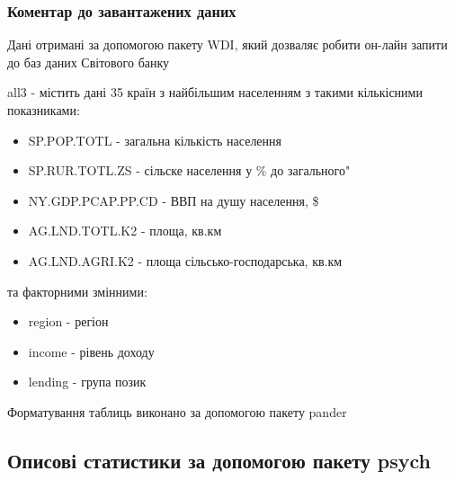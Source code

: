 \documentclass[
]{article}
\providecommand{\tightlist}{%
  \setlength{\itemsep}{0pt}\setlength{\parskip}{0pt}}
\begin{document}
\hypertarget{ux43aux43eux43cux435ux43dux442ux430ux440-ux434ux43e-ux437ux430ux432ux430ux43dux442ux430ux436ux435ux43dux438ux445-ux434ux430ux43dux438ux445}{%
\subsubsection{Коментар до завантажених
даних}\label{ux43aux43eux43cux435ux43dux442ux430ux440-ux434ux43e-ux437ux430ux432ux430ux43dux442ux430ux436ux435ux43dux438ux445-ux434ux430ux43dux438ux445}}

Дані отримані за допомогою пакету WDI, який дозваляє робити он-лайн
запити до баз даних Світового банку

all3 - містить дані 35 країн з найбільшим населенням з такими
кількісними показниками:

\begin{itemize}
\tightlist
\item
  SP.POP.TOTL - загальна кількість населення
\item
  SP.RUR.TOTL.ZS - сільске населення у \% до загального"
\item
  NY.GDP.PCAP.PP.CD - ВВП на душу населення, \$
\item
  AG.LND.TOTL.K2 - площа, кв.км
\item
  AG.LND.AGRI.K2 - площа сільсько-господарська, кв.км
\end{itemize}

та факторними змінними:

\begin{itemize}
\tightlist
\item
  region - регіон
\item
  income - рівень доходу
\item
  lending - група позик
\end{itemize}

Форматування таблиць виконано за допомогою пакету pander

\hypertarget{ux43eux43fux438ux441ux43eux432ux456-ux441ux442ux430ux442ux438ux441ux442ux438ux43aux438-ux437ux430-ux434ux43eux43fux43eux43cux43eux433ux43eux44e-ux43fux430ux43aux435ux442ux443-psych}{%
\subsection{Описові статистики за допомогою пакету
psych}\label{ux43eux43fux438ux441ux43eux432ux456-ux441ux442ux430ux442ux438ux441ux442ux438ux43aux438-ux437ux430-ux434ux43eux43fux43eux43cux43eux433ux43eux44e-ux43fux430ux43aux435ux442ux443-psych}}
\end{document}
